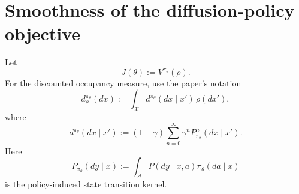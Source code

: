 \documentclass{article}
\theoremstyle{definition}
\theoremstyle{remark}
\theoremstyle{mystyle}
\newcommand{\1}{\mathbbm{1}}
\begin{document}
\newpage
\section{Smoothness of the diffusion-policy objective}

Let
\[
J(\theta):=V^{\pi_\theta}(\rho).
\]
For the discounted occupancy measure, use the paper's notation
\[
d_\rho^{\pi_\theta}(dx)
:=
\int_{\mathcal X}d^{\pi_\theta}(dx\mid x')\,\rho(dx'),
\]
where
\[
d^{\pi_\theta}(dx\mid x')
:=
(1-\gamma)\sum_{n=0}^{\infty}\gamma^n
P_{\pi_\theta}^n(dx\mid x').
\]
Here
\[
P_{\pi_\theta}(dy\mid x)
:=
\int_{\mathcal A}P(dy\mid x,a)\pi_\theta(da\mid x)
\]
is the policy-induced state transition kernel.
\end{document}
